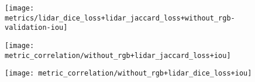 \begin{figure}[H]
  \centering
  \texttt{[image: metrics/lidar\_dice\_loss+lidar\_jaccard\_loss+without\_rgb-validation-iou]}
\end{figure}

\begin{figure}[H]
  \centering
  \texttt{[image: metric\_correlation/without\_rgb+lidar\_jaccard\_loss+iou]}
\end{figure}

\begin{figure}[H]
  \centering
  \texttt{[image: metric\_correlation/without\_rgb+lidar\_dice\_loss+iou]}
\end{figure}

